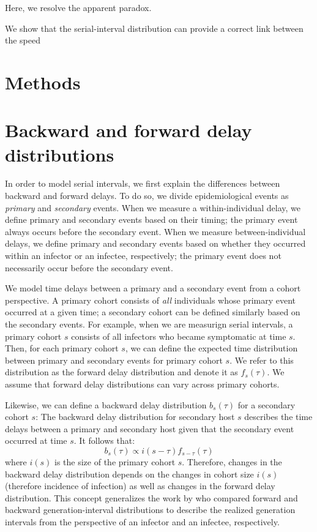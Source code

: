 \documentclass[12pt]{article}
\begin{document}
Here, we resolve the apparent paradox.

We show that the serial-interval distribution can provide a correct link between the speed 

\section{Methods}

\section{Backward and forward delay distributions}

In order to model serial intervals, we first explain the differences between backward and forward delays.
To do so, we divide epidemiological events as \emph{primary} and \emph{secondary} events.
When we measure a within-individual delay, we define primary and secondary events based on their timing;
the primary event always occurs before the secondary event.
When we measure between-individual delays, we define primary and secondary events based on whether they occurred within an infector or an infectee, respectively;
the primary event does not necessarily occur before the secondary event.

We model time delays between a primary and a secondary event from a cohort perspective.
A primary cohort consists of \emph{all} individuals whose primary event occurred at a given time; 
a secondary cohort can be defined similarly based on the secondary events.
For example, when we are measurign serial intervals, a primary cohort $s$ consists of all infectors who became symptomatic at time $s$.
Then, for each primary cohort $s$, we can define the expected time distribution between primary and secondary events for primary cohort $s$.
We refer to this distribution as the forward delay distribution and denote it as $f_s(\tau)$.
We assume that forward delay distributions can vary across primary cohorts.

Likewise, we can define a backward delay distribution $b_s(\tau)$ for a secondary cohort $s$:
The backward delay distribution for secondary host $s$ describes the time delays between a primary and secondary host given that the secondary event occurred at time $s$.
It follows that:
\begin{equation}
b_s(\tau) \propto i(s-\tau) f_{s-\tau}(\tau)
\end{equation}
where $i(s)$ is the size of the primary cohort $s$.
Therefore, changes in the backward delay distribution depends on the changes in cohort size $i(s)$ (therefore incidence of infection) as well as changes in the forward delay distribution.
This concept generalizes the work by \citep{champredon2015intrinsic} who compared forward and backward generation-interval distributions to describe the realized generation intervals from the perspective of an infector and an infectee, respectively.
\end{document}
